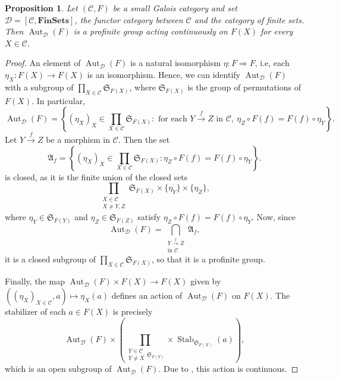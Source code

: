 \documentclass[10pt]{article}
\theoremstyle{thmstyle}
\newtheorem{proposition}[theorem]{Proposition}
\theoremstyle{defstyle}
\newcommand{\frakS}{\mathfrak{S}} %
\newcommand{\catFinSets}{\mathbf{FinSets}}
\newcommand{\Aut}{\operatorname{Aut}}
\newcommand{\frakA}{\mathfrak{A}}
\newcommand{\scrC}{\mathscr{C}} %
\newcommand{\scrD}{\mathscr{D}} %
\newcommand{\Stab}{\operatorname{Stab}}
\begin{document}
\begin{proposition}
    Let $(\scrC, F)$ be a small Galois category and set $\scrD = \left[\scrC,\catFinSets\right]$, the functor category between $\scrC$ and the category of finite sets. Then $\Aut_{\scrD}(F)$ is a profinite group acting continuously on $F(X)$ for every $X\in\scrC$.
\end{proposition}
\begin{proof}
    An element of $\Aut_{\scrD}(F)$ is a natural isomorphism $\eta: F\Rightarrow F$, i.e, each $\eta_X: F(X)\to F(X)$ is an isomorphism. Hence, we can identify $\Aut_{\scrD}(F)$ with a subgroup of $\displaystyle\prod_{X\in\scrC}\frakS_{F(X)}$, where $\frakS_{F(X)}$ is the group of permutations of $F(X)$. In particular, 
    \begin{equation*}
        \Aut_{\scrD}(F) = \left\{(\eta_X)_{X}\in\prod_{X\in\scrC}\frakS_{F(X)}\colon\text{ for each }Y\xrightarrow{f}Z\text{ in }\scrC,~\eta_Z\circ F(f) = F(f)\circ\eta_Y\right\}.
    \end{equation*}
    Let $Y\xrightarrow{f} Z$ be a morphism in $\scrC$. Then the set 
    \begin{equation*}
        \frakA_f = \left\{(\eta_X)_X \in\prod_{X\in\scrC} \frakS_{F(X)}\colon \eta_Z\circ F(f) = F(f)\circ\eta_Y\right\}.
    \end{equation*}
    is closed, as it is the finite union of the closed sets 
    \begin{equation*}
        \prod_{\substack{X\in\scrC\\ X\ne Y, Z}}\frakS_{F(X)}\times\{\eta_Y\}\times\{\eta_Z\},
    \end{equation*}
    where $\eta_Y\in\frakS_{F(Y)}$ and $\eta_Z\in\frakS_{F(Z)}$ satisfy $\eta_Z\circ F(f) = F(f)\circ\eta_Y$. Now, since 
    \begin{equation*}
        \Aut_{\scrD}(F) = \bigcap_{\substack{Y\xrightarrow{f} Z\\\text{in }\scrC}}\frakA_f,
    \end{equation*}
    it is a closed subgroup of $\displaystyle\prod_{X\in\scrC}\frakS_{F(X)}$, so that it is a profinite group.

    Finally, the map $\Aut_{\scrD}(F)\times F(X)\to F(X)$ given by $\left((\eta_X)_{X\in\scrC}, a\right)\longmapsto\eta_X(a)$ defines an action of $\Aut_{\scrD}(F)$ on $F(X)$. The stabilizer of each $a\in F(X)$ is precisely 
    \begin{equation*}
        \Aut_{\scrD}(F)\times\left(\prod_{\substack{Y\in\scrC\\ Y\ne X}\frakS_{F(Y)}}\times\Stab_{\frakS_{F(X)}}(a)\right),
    \end{equation*}
    which is an open subgroup of $\Aut_{\scrD}(F)$. Due to , this action is continuous.
\end{proof}
\end{document}
